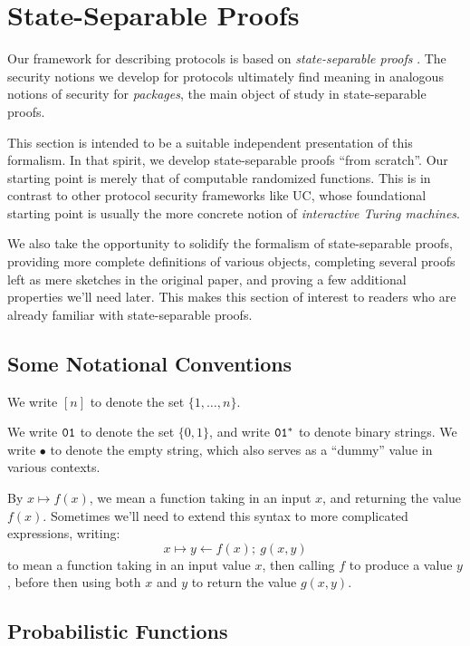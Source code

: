 \section{State-Separable Proofs}

Our framework for describing protocols is based on 
\emph{state-separable proofs}
\cite{AC:BDFKK18}.
The security notions we develop for protocols ultimately
find meaning in analogous notions of security for \emph{packages},
the main object of study in state-separable proofs.

This section is intended to be a suitable independent presentation
of this formalism.
In that spirit, we develop state-separable proofs ``from scratch''.
Our starting point is merely that of computable randomized functions.
This is in contrast to other protocol security frameworks like UC,
whose foundational starting point is usually the more concrete notion
of \emph{interactive Turing machines}.

We also take the opportunity to solidify the formalism of state-separable
proofs, providing more complete definitions of various objects,
completing several proofs left as mere sketches in the original paper,
and proving a few additional properties we'll need later.
This makes this section of interest to readers who are already familiar
with state-separable proofs.

\subsection{Some Notational Conventions}

We write $[n]$ to denote the set $\{1, \ldots, n\}$.

We write $\texttt{01}$ to denote the set $\{0, 1\}$,
and write $\texttt{01}^*$ to denote binary strings.
We write $\bullet$ to denote the empty string,
which also serves as a ``dummy'' value in various contexts.

By $x \mapsto f(x)$, we mean a function taking in an input
$x$, and returning the value $f(x)$.
Sometimes we'll need to extend this syntax to more complicated expressions,
writing:
$$
x \mapsto y \gets f(x);\ g(x, y)
$$
to mean a function taking in an input value $x$,
then calling $f$ to produce a value $y$, before then using
both $x$ and $y$ to return the value $g(x, y)$.

\subsection{Probabilistic Functions}

